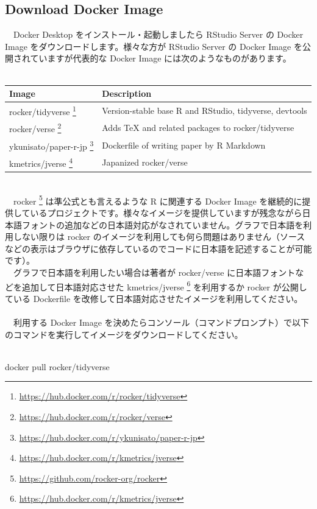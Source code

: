 \documentclass[
  12pt,
]{book}
\newenvironment{Shaded}{\begin{snugshade}}{\end{snugshade}}
\newcommand{\ExtensionTok}[1]{#1}
\newcommand{\NormalTok}[1]{#1}
\DeclareRobustCommand{\href}[2]{#2\footnote{\url{#1}}}
\begin{document}
\hypertarget{download-docker-image}{%
\subsection{Download Docker Image}\label{download-docker-image}}

　Docker Desktop をインストール・起動しましたら RStudio Server の Docker Image をダウンロードします。様々な方が RStudio Server の Docker Image を公開されていますが代表的な Docker Image には次のようなものがあります。\\
　

\begin{longtable}[]{@{}ll@{}}
\toprule
Image & Description \\
\midrule
\endhead
\href{https://hub.docker.com/r/rocker/tidyverse}{rocker/tidyverse } & Version-stable base R and RStudio, tidyverse, devtools \\
\href{https://hub.docker.com/r/rocker/verse}{rocker/verse } & Adds TeX and related packages to rocker/tidyverse \\
\href{https://hub.docker.com/r/ykunisato/paper-r-jp}{ykunisato/paper-r-jp } & Dockerfile of writing paper by R Markdown \\
\href{https://hub.docker.com/r/kmetrics/jverse}{kmetrics/jverse } & Japanized rocker/verse \\
\bottomrule
\end{longtable}

　\\
　\href{https://github.com/rocker-org/rocker}{rocker } は準公式とも言えるような R に関連する Docker Image を継続的に提供しているプロジェクトです。様々なイメージを提供していますが残念ながら日本語フォントの追加などの日本語対応がなされていません。グラフで日本語を利用しない限りは rocker のイメージを利用しても何ら問題はありません（ソースなどの表示はブラウザに依存しているのでコードに日本語を記述することが可能です）。\\
　グラフで日本語を利用したい場合は著者が rocker/verse に日本語フォントなどを追加して日本語対応させた \href{https://hub.docker.com/r/kmetrics/jverse}{kmetrics/jverse } を利用するか rocker が公開している Dockerfile を改修して日本語対応させたイメージを利用してください。\\
　\\
　利用する Docker Image を決めたらコンソール（コマンドプロンプト）で以下のコマンドを実行してイメージをダウンロードしてください。\\
　

\begin{Shaded}
\begin{Highlighting}[]
\ExtensionTok{docker}\NormalTok{ pull rocker/tidyverse}
\end{Highlighting}
\end{Shaded}
\end{document}
